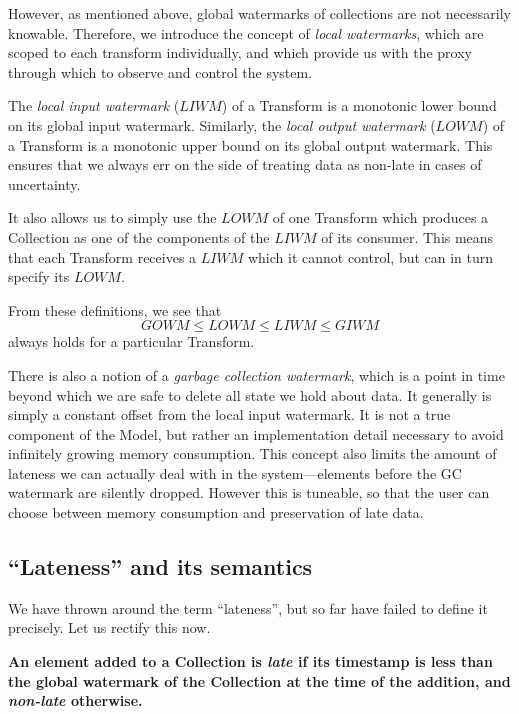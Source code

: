 However, as mentioned above, global watermarks of collections are not necessarily knowable.
Therefore, we introduce the concept of \emph{local watermarks}, which are scoped to each transform individually, and which provide us with the proxy through which to observe and control the system.

The \emph{local input watermark} ($\mathit{LIWM}$) of a Transform is a monotonic lower bound on its global input watermark.
Similarly, the \emph{local output watermark} ($\mathit{LOWM}$) of a Transform is a monotonic upper bound on its global output watermark.
This ensures that we always err on the side of treating data as non-late in cases of uncertainty.

It also allows us to simply use the $\mathit{LOWM}$ of one Transform which produces a Collection as one of the components of the $\mathit{LIWM}$ of its consumer.
This means that each Transform receives a $\mathit{LIWM}$ which it cannot control, but can in turn specify its $\mathit{LOWM}$.


From these definitions, we see that \[ \mathit{GOWM} \leq \mathit{LOWM} \leq \mathit{LIWM} \leq \mathit{GIWM} \] always holds for a particular Transform.

There is also a notion of a \emph{garbage collection watermark}, which is a point in time beyond which we are safe to delete all state we hold about data.
It generally is simply a constant offset from the local input watermark.
It is not a true component of the Model, but rather an implementation detail necessary to avoid infinitely growing memory consumption.
This concept also limits the amount of lateness we can actually deal with in the system---elements before the GC watermark are silently dropped.
However this is tuneable, so that the user can choose between memory consumption and preservation of late data.

\subsection{``Lateness'' and its semantics}\label{sec:impl:dataflow:lateness}

We have thrown around the term ``lateness'', but so far have failed to define it precisely.
Let us rectify this now.


\textbf{An element added to a Collection is \emph{late} if its timestamp is less than the global watermark of the Collection at the time of the addition, and \emph{non-late} otherwise.}

